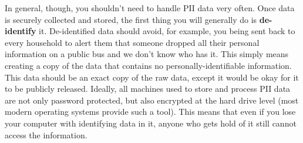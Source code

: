 In general, though, you shouldn't need to handle PII data very often.
Once data is securely collected and stored, the first thing you will generally do is \textbf{de-identify} it.
De-identified data should avoid, for example, you being sent back to every household
to alert them that someone dropped all their personal information on a public bus and we don't know who has it.
This simply means creating a copy of the data that contains no personally-identifiable information.
This data should be an exact copy of the raw data,
except it would be okay for it to be publicly released.\cite{matthews2011data}
Ideally, all machines used to store and process PII data are not only password protected, but also encrypted at the hard drive level
(most modern operating systems provide such a tool).
This means that even if you lose your computer with identifying data in it,
anyone who gets hold of it still cannot access the information.
